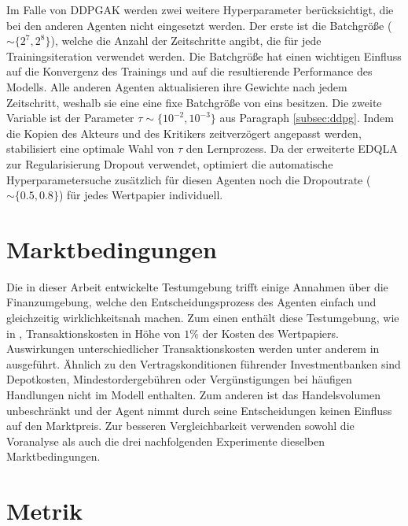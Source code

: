 Im Falle von \acs{DDPGAK} werden zwei weitere Hyperparameter berücksichtigt, die bei den anderen Agenten nicht eingesetzt werden. Der erste ist die Batchgröße ($\sim\{2^7,2^8\}$), welche die Anzahl der Zeitschritte angibt, die für jede Trainingsiteration verwendet werden. Die Batchgröße hat einen wichtigen Einfluss auf die Konvergenz des Trainings und auf die resultierende Performance des Modells. Alle anderen Agenten aktualisieren ihre Gewichte nach jedem Zeitschritt, weshalb sie eine eine fixe Batchgröße von eins besitzen.
Die zweite Variable ist der Parameter $\tau\sim\{10^{-2},10^{-3}\}$ aus Paragraph \ref{subsec:ddpg}. Indem die Kopien des Akteurs und des Kritikers zeitverzögert angepasst werden, stabilisiert eine optimale Wahl von $\tau$ den Lernprozess.
Da der erweiterte \acs{EDQLA} zur Regularisierung Dropout verwendet, optimiert die automatische Hyperparametersuche zusätzlich für diesen Agenten noch die Dropoutrate ($\sim\{0.5,0.8\}$) für jedes Wertpapier individuell.

\section{Marktbedingungen}
\label{sec:marktbedingungen}

Die in dieser Arbeit entwickelte Testumgebung trifft einige Annahmen über die Finanzumgebung, welche den Entscheidungsprozess des Agenten einfach und gleichzeitig wirklichkeitsnah machen. 
Zum einen enthält diese Testumgebung, wie in \parencite{théate2020application,moodysaffell,zhang2019deep}, Transaktionskosten in Höhe von $1\%$ der Kosten des Wertpapiers. Auswirkungen unterschiedlicher Transaktionskosten werden unter anderem in \parencites{théate2020application,moodysaffell} ausgeführt.
Ähnlich zu den Vertragskonditionen führender Investmentbanken sind Depotkosten, Mindestordergebühren oder Vergünstigungen bei häufigen Handlungen nicht im Modell enthalten.
Zum anderen ist das Handelsvolumen unbeschränkt und der Agent nimmt durch seine Entscheidungen keinen Einfluss auf den Marktpreis.
Zur besseren Vergleichbarkeit verwenden sowohl die Voranalyse als auch die drei nachfolgenden Experimente dieselben Marktbedingungen.
 
\section{Metrik}
\label{sec:metrik}

